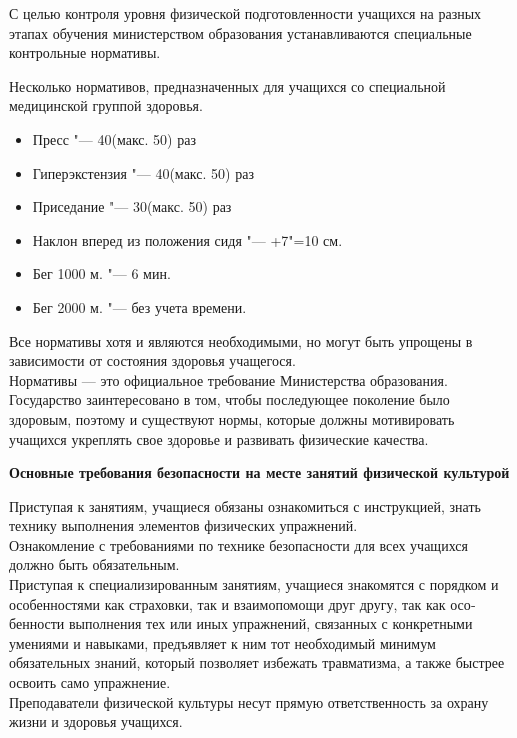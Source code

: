 \begin{flushleft}
С целью контроля уровня физической подготовленности учащихся на разных этапах обучения
министерством образования устанавливаются специальные контрольные нормативы.

Несколько нормативов, предназначенных для учащихся со специальной медицинской группой здоровья. \\

\begin{itemize}
    \item Пресс "--- 40(макс. 50) раз
    \item Гиперэкстензия "--- 40(макс. 50) раз
    \item Приседание "--- 30(макс. 50) раз
    \item Наклон вперед из положения сидя "--- +7"=10 см.
    \item Бег 1000 м. "--- 6 мин.
    \item Бег 2000 м. "--- без учета времени.
\end{itemize}
Все нормативы хотя и являются необходимыми, но могут быть упрощены в зависимости от состояния здоровья учащегося.\\

Нормативы — это официальное требование Министерства образования. 
Государство заинтересовано в том, чтобы последующее поколение 
было здоровым, поэтому и существуют нормы, которые должны мотивировать учащихся
укреплять свое здоровье и развивать физические качества.\\


\newpage
\begin{center}
    \textbf{Основные требования безопасности на месте занятий физической культурой}
\end{center}
\vspace*{14pt}

Приступая к занятиям, учащиеся обязаны ознакомиться с инструкцией, знать техни­ку выполнения 
элементов физических упражнений.\\
Ознакомление с требованиями по технике безопасности для всех учащихся должно быть обязательным. \\
Приступая к специализированным занятиям, учащиеся знакомятся с порядком и особенностями как страховки, 
так и взаимопомощи друг другу, так как осо­бенности выполнения тех или иных упражнений, связанных с конкретными 
умениями и навыками, предъявляет к ним тот необходимый минимум обязательных знаний, который позволяет избежать 
травматизма, а также быстрее освоить само упражнение.\\
Преподаватели физической культуры несут прямую ответственность за охрану жиз­ни и здоровья учащихся.
\vspace*{14pt}


\end{flushleft}
